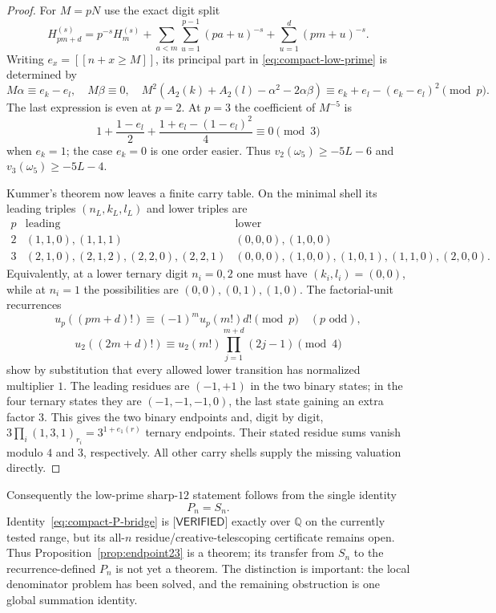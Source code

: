 \documentclass[11pt,reqno]{amsart}
\theoremstyle{plain}
\theoremstyle{definition}
\theoremstyle{remark}
\numberwithin{equation}{section}
\newcommand{\ii}[1]{[\![#1]\!]}
\newcommand{\VERIFIED}{\textsf{[VERIFIED]}}
\begin{document}
\begin{proof}
For $M=pN$ use the exact digit split
\[
 H_{pm+d}^{(s)}=p^{-s}H_m^{(s)}+
 \sum_{a<m}\sum_{u=1}^{p-1}(pa+u)^{-s}
 +\sum_{u=1}^{d}(pm+u)^{-s}.
\]
Writing $e_x=\ii{n+x\ge M}$, its principal part in
\eqref{eq:compact-low-prime} is determined by
\[
 M\alpha\equiv e_k-e_l,\quad M\beta\equiv0,\quad
 M^2(A_2(k)+A_2(l)-\alpha^2-2\alpha\beta)
 \equiv e_k+e_l-(e_k-e_l)^2\pmod p.
\]
The last expression is even at $p=2$.  At $p=3$ the coefficient of
$M^{-5}$ is
\[
 1+\frac{1-e_l}{2}+\frac{1+e_l-(1-e_l)^2}{4}\equiv0\pmod3
\]
when $e_k=1$; the case $e_k=0$ is one order easier.  Thus
$v_2(\omega_5)\ge-5L-6$ and $v_3(\omega_5)\ge-5L-4$.

Kummer's theorem now leaves a finite carry table.  On the minimal shell its
leading triples $(n_L,k_L,l_L)$ and lower triples are
\[
\begin{array}{c|c|c}
p&\text{leading}&\text{lower}\ \\ \hline
2&(1,1,0),(1,1,1)&(0,0,0),(1,0,0)\\
3&(2,1,0),(2,1,2),(2,2,0),(2,2,1)&
 (0,0,0),(1,0,0),(1,0,1),(1,1,0),(2,0,0).
\end{array}
\]
Equivalently, at a lower ternary digit $n_i=0,2$ one must have
$(k_i,l_i)=(0,0)$, while at $n_i=1$ the possibilities are
$(0,0),(0,1),(1,0)$.  The factorial-unit recurrences
\[
 u_p((pm+d)!)\equiv(-1)^mu_p(m!)d!\pmod p\quad(p\text{ odd}),
\]
\[
 u_2((2m+d)!)\equiv u_2(m!)\prod_{j=1}^{m+d}(2j-1)\pmod4
\]
show by substitution that every allowed lower transition has normalized
multiplier $1$.  The leading residues are $(-1,+1)$ in the two binary states;
in the four ternary states they are $(-1,-1,-1,0)$, the last state gaining an
extra factor $3$.  This gives the two binary endpoints and, digit by digit,
$3\prod_i(1,3,1)_{r_i}=3^{1+e_1(r)}$ ternary endpoints.  Their stated residue
sums vanish modulo $4$ and $3$, respectively.  All other carry shells supply
the missing valuation directly.
\end{proof}

Consequently the low-prime sharp-$12$ statement follows from the single
identity
\begin{equation}\label{eq:compact-P-bridge}
 P_n=S_n.
\end{equation}
Identity~\eqref{eq:compact-P-bridge} is $\VERIFIED$ exactly over $\mathbb Q$
on the currently tested range, but its all-$n$ residue/creative-telescoping
certificate remains open.  Thus Proposition~\ref{prop:endpoint23} is a theorem;
its transfer from $S_n$ to the recurrence-defined $P_n$ is not yet a theorem.
The distinction is important: the local denominator problem has been solved,
and the remaining obstruction is one global summation identity.
\end{document}
